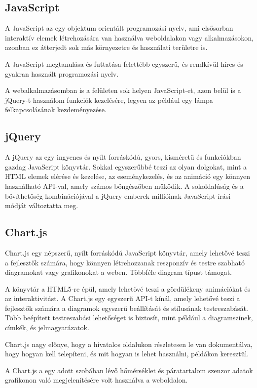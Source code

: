 \documentclass[
]{thesis-ekf}
\theoremstyle{definition}
\theoremstyle{remark}
\begin{document}
	\subsection{JavaScript}
	A JavaScript az egy objektum orientált programozási nyelv, ami elsősorban interaktív elemek létrehozására van használva weboldalakon vagy alkalmazásokon, azonban ez átterjedt sok más környezetre és használati területre is.
	
	A JavaScript megtanulása és futtatása felettébb egyszerű, és rendkívül híres és gyakran használt programozási nyelv.\cite{javascript}
	
	A webalkalmazásomban is a felületen sok helyen JavaScript-et, azon belül is a jQuery-t használom funkciók kezelésére, legyen az például egy lámpa felkapcsolásának kezdeményezése.
	
	\subsection{jQuery}
	A jQuery az egy ingyenes és nyílt forráskódú, gyors, kisméretű és funkciókban gazdag JavaScript könyvtár. Sokkal egyszerűbbé teszi az olyan dolgokat, mint a HTML elemek elérése és kezelése, az eseménykezelés, és az animáció egy könnyen használható API-val, amely számos böngészőben működik. A sokoldalúság és a bővíthetőség kombinációjával a jQuery emberek millióinak JavaScript-írási módját változtatta meg. \cite{jquery}
	
	\subsection{Chart.js}
	Chart.js egy népszerű, nyílt forráskódú JavaScript könyvtár, amely lehetővé teszi a fejlesztők számára, hogy könnyen létrehozzanak reszponzív és testre szabható diagramokat vagy grafikonokat a weben. Többféle diagram típust támogat.
	
	A könyvtár a HTML5-re épül, amely lehetővé teszi a gördülékeny animációkat és az interaktivitást. A Chart.js egy egyszerű API-t kínál, amely lehetővé teszi a fejlesztők számára a diagramok egyszerű beállítását és stílusának testreszabását. Több beépített testreszabási lehetőséget is biztosít, mint például a diagramszínek, címkék, és jelmagyarázatok.\cite{chartJS}
	
	Chart.js nagy előnye, hogy a hivatalos oldalukon részletesen le van dokumentálva, hogy hogyan kell telepíteni, és mit hogyan is lehet használni, példákon keresztül.
	
	A Chart.js a egy adott szobában lévő hőmérséklet és páratartalom szenzor adatok grafikonon való megjelenítésére volt használva a weboldalon.
	
\end{document}

